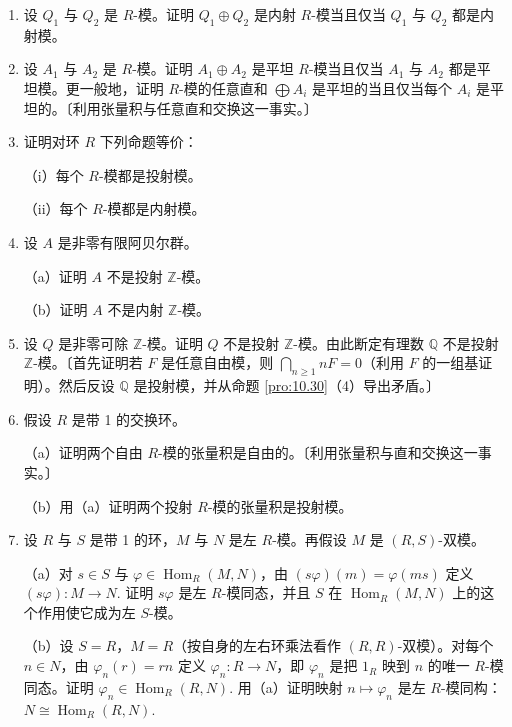 \begin{enumerate}
\item 设 \(Q_1\) 与 \(Q_2\) 是 \(R\)-模。证明 \(Q_1 \oplus Q_2\) 是内射 \(R\)-模当且仅当 \(Q_1\) 与 \(Q_2\) 都是内射模。

\item 设 \(A_1\) 与 \(A_2\) 是 \(R\)-模。证明 \(A_1 \oplus A_2\) 是平坦 \(R\)-模当且仅当 \(A_1\) 与 \(A_2\) 都是平坦模。更一般地，证明 \(R\)-模的任意直和 \(\bigoplus A_i\) 是平坦的当且仅当每个 \(A_i\) 是平坦的。〔利用张量积与任意直和交换这一事实。〕

\item 证明对环 \(R\) 下列命题等价：

（i）每个 \(R\)-模都是投射模。

（ii）每个 \(R\)-模都是内射模。

\item 设 \(A\) 是非零有限阿贝尔群。

（a）证明 \(A\) 不是投射 \(\mathbb{Z}\)-模。

（b）证明 \(A\) 不是内射 \(\mathbb{Z}\)-模。

\item 设 \(Q\) 是非零可除 \(\mathbb{Z}\)-模。证明 \(Q\) 不是投射 \(\mathbb{Z}\)-模。由此断定有理数 \(\mathbb{Q}\) 不是投射 \(\mathbb{Z}\)-模。〔首先证明若 \(F\) 是任意自由模，则 \(\bigcap_{n \geq 1} nF = 0\)（利用 \(F\) 的一组基证明）。然后反设 \(\mathbb{Q}\) 是投射模，并从命题 \ref{pro:10.30}（4）导出矛盾。〕

\item 假设 \(R\) 是带 1 的交换环。

（a）证明两个自由 \(R\)-模的张量积是自由的。〔利用张量积与直和交换这一事实。〕

（b）用（a）证明两个投射 \(R\)-模的张量积是投射模。

\item 设 \(R\) 与 \(S\) 是带 1 的环，\(M\) 与 \(N\) 是左 \(R\)-模。再假设 \(M\) 是 \((R, S)\)-双模。

（a）对 \(s \in S\) 与 \(\varphi \in \operatorname{Hom}_R(M, N)\)，由 \((s\varphi)(m) = \varphi(ms)\) 定义 \((s\varphi) : M \to N\). 证明 \(s\varphi\) 是左 \(R\)-模同态，并且 \(S\) 在 \(\operatorname{Hom}_R(M, N)\) 上的这个作用使它成为左 \(S\)-模。

（b）设 \(S = R\)，\(M = R\)（按自身的左右环乘法看作 \((R, R)\)-双模）。对每个 \(n \in N\)，由 \(\varphi_n(r) = rn\) 定义 \(\varphi_n : R \to N\)，即 \(\varphi_n\) 是把 \(1_R\) 映到 \(n\) 的唯一 \(R\)-模同态。证明 \(\varphi_n \in \operatorname{Hom}_R(R, N)\). 用（a）证明映射 \(n \mapsto \varphi_n\) 是左 \(R\)-模同构：\(N \cong \operatorname{Hom}_R(R, N)\).


\end{enumerate}
